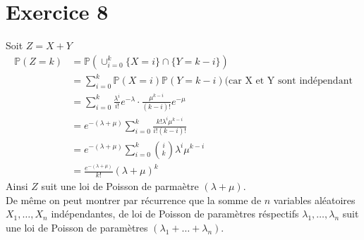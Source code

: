 \documentclass[td3.tex]{sufiles}
\begin{document}
\section{Exercice 8}
Soit $Z = X + Y$
\begin{align*}
  \mathbb{P}(Z = k) &= \mathbb{P}(\cup_{i=0}^k \{X=i\} \cap \{ Y=k-i\}) \\
  &= \sum_{i=0}^k \mathbb{P}(X=i) \mathbb{P}(Y=k-i) \text{(car X et Y sont indépendant}\\
  &= \sum_{i=0}^k \frac{\lambda^i}{i!}e^{-\lambda} \cdot \frac{\mu^{k-i}}{(k-i)!}e^{-\mu} \\
  &= e^{-(\lambda + \mu)} \sum_{i=0}^k \frac{k! \lambda^i \mu^{k-i}}{i! (k-i)!} \\
  &= e^{-(\lambda + \mu)} \sum_{i=0}^k \binom{i}{k} \lambda^i \mu^{k-i} \\
  &= \frac{e^{-(\lambda + \mu)}}{k!}(\lambda + \mu)^k
\end{align*}
Ainsi $Z$ suit une loi de Poisson de parmaètre $(\lambda + \mu)$. \\
De même on peut montrer par récurrence que la somme de $n$ variables aléatoires $X_1,\dots,X_n$ indépendantes, de loi de Poisson de paramètres réspectifs $\lambda_1,\dots,\lambda_n$ suit une loi de Poisson de paramètres $(\lambda_1 + \dots + \lambda_n)$.
\end{document}
